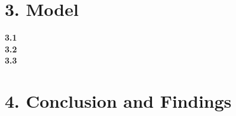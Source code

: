 \documentclass[12pt,a4paper]{article}
\begin{document}
\section*{3. Model}
\textbf{\large 3.1 }\\



\vspace{0.4cm}
\noindent\textbf{\large 3.2 }\\



\vspace{0.4cm}
\noindent\textbf{\large 3.3 }\\



\section*{4. Conclusion and Findings}
\end{document}
